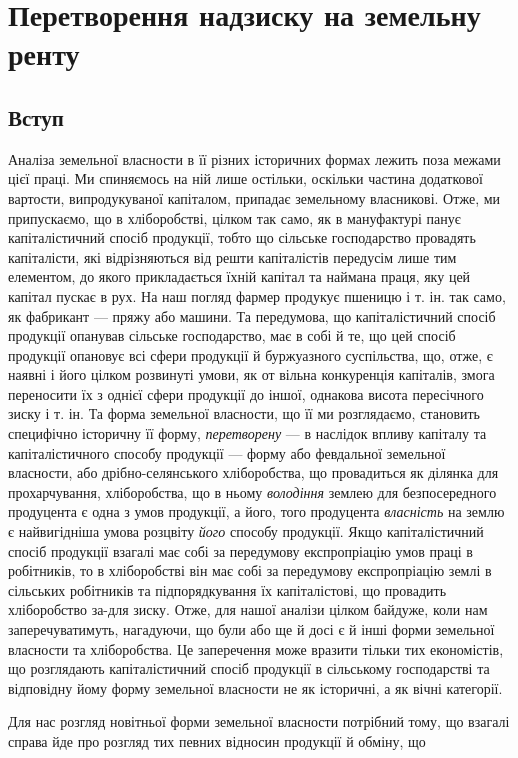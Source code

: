 
\chapter{Перетворення надзиску на земельну ренту}

\section{Вступ}

Аналіза земельної власности в її різних історичних формах лежить поза
межами цієї праці. Ми спиняємось на ній лише остільки, оскільки частина додаткової
вартости, випродукуваної капіталом, припадає земельному власникові.
Отже, ми припускаємо, що в хліборобстві, цілком так само, як в мануфактурі
панує капіталістичний спосіб продукції, тобто що сільське господарство провадять
капіталісти, які відрізняються від решти капіталістів передусім лише тим
елементом, до якого прикладається їхній капітал та наймана праця, яку цей
капітал пускає в рух. На наш погляд фармер продукує пшеницю і т. ін. так
само, як фабрикант — пряжу або машини. Та передумова, що капіталістичний спосіб
продукції опанував сільське господарство, має в собі й те, що цей спосіб продукції
опановує всі сфери продукції й буржуазного суспільства, що, отже,
є наявні і його цілком розвинуті умови, як от вільна конкуренція капіталів,
змога переносити їх з однієї сфери продукції до іншої, однакова висота пересічного
зиску і т. ін. Та форма земельної власности, що її ми розглядаємо,
становить специфічно історичну її форму, \emph{перетворену} — в наслідок впливу
капіталу та капіталістичного способу продукції — форму або февдальної земельної
власности, або дрібно-селянського хліборобства, що провадиться як ділянка
для прохарчування, хліборобства, що в ньому \emph{володіння} землею для безпосередного
продуцента є одна з умов продукції, а його, того продуцента \emph{власність}
на землю є найвигідніша умова розцвіту \emph{його} способу продукції. Якщо
капіталістичний спосіб продукції взагалі має собі за передумову експропріацію
умов праці в робітників, то в хліборобстві він має собі за передумову
експропріацію землі в сільських робітників та підпорядкування їх капіталістові,
що провадить хліборобство за-для зиску. Отже, для нашої аналізи цілком байдуже,
коли нам заперечуватимуть, нагадуючи, що були або ще й досі є й інші
форми земельної власности та хліборобства. Це заперечення може вразити тільки
тих економістів, що розглядають капіталістичний спосіб продукції в сільському
господарстві та відповідну йому форму земельної власности не як історичні, а як
вічні категорії.

Для нас розгляд новітньої форми земельної власности потрібний тому, що
взагалі справа йде про розгляд тих певних відносин продукції й обміну, що
\parbreak{}  %
